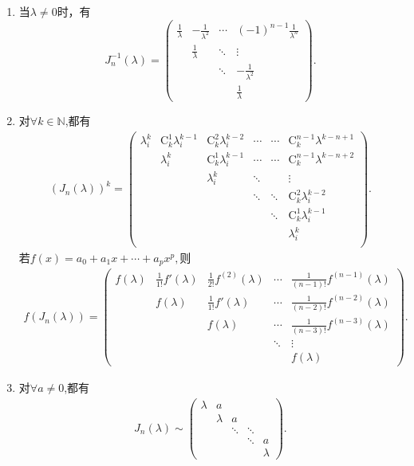 \documentclass[../../main.tex]{subfiles}
\begin{document}
\begin{proposition}[Jordan块的性质]
\begin{enumerate}[(1)]
\item 当$\lambda\neq 0$时，有
\[
J_n^{-1}(\lambda)=
\begin{pmatrix}
\frac{1}{\lambda} & -\frac{1}{\lambda^2} & \cdots & (-1)^{n - 1}\frac{1}{\lambda^n} \\
 & \frac{1}{\lambda} & \ddots & \vdots \\
 &  & \ddots & -\frac{1}{\lambda^2} \\
 &  &  & \frac{1}{\lambda}
\end{pmatrix}.
\]

\item 对$\forall k\in \mathbb{N}$,都有
\begin{align*}
\left( J_n\left( \lambda \right) \right) ^k=\left( \begin{matrix}
\lambda _{i}^{k}&		\mathrm{C}_{k}^{1}\lambda _{i}^{k-1}&		\mathrm{C}_{k}^{2}\lambda _{i}^{k-2}&		\cdots&		\cdots&		\mathrm{C}_{k}^{n-1}\lambda ^{k-n+1}\\
&		\lambda _{i}^{k}&		\mathrm{C}_{k}^{1}\lambda _{i}^{k-1}&		\cdots&		\cdots&		\mathrm{C}_{k}^{n-1}\lambda ^{k-n+2}\\
&		&		\lambda _{i}^{k}&		\ddots&		&		\vdots\\
&		&		&		\ddots&		\ddots&		\mathrm{C}_{k}^{2}\lambda _{i}^{k-2}\\
&		&		&		&		\ddots&		\mathrm{C}_{k}^{1}\lambda _{i}^{k-1}\\
&		&		&		&		&		\lambda _{i}^{k}\\
\end{matrix} \right) .
\end{align*}
若$f(x)=a_0+a_1x+\cdots+a_px^p,$则
\begin{align*}
f(J_n(\lambda))= \begin{pmatrix}
f(\lambda ) & \frac{1}{1!}f'(\lambda ) & \frac{1}{2!}f^{(2)}(\lambda ) & \cdots & \frac{1}{(n - 1)!}f^{(n - 1)}(\lambda ) \\
& f(\lambda ) & \frac{1}{1!}f'(\lambda ) & \cdots & \frac{1}{(n - 2)!}f^{(n - 2)}(\lambda ) \\
& & f(\lambda ) & \cdots & \frac{1}{(n - 3)!}f^{(n - 3)}(\lambda ) \\
& & & \ddots & \vdots \\
& & & & f(\lambda )
\end{pmatrix}. 
\end{align*}

\item 对$\forall a\ne 0$,都有
\begin{align*}
J_n(\lambda) \sim \begin{pmatrix}
\lambda & a & & & \\
& \lambda & a & & \\
& & \ddots & \ddots & \\
& & & \ddots & a \\
& & & & \lambda
\end{pmatrix}.
\end{align*}

\end{enumerate}
\end{proposition}
\end{document}
